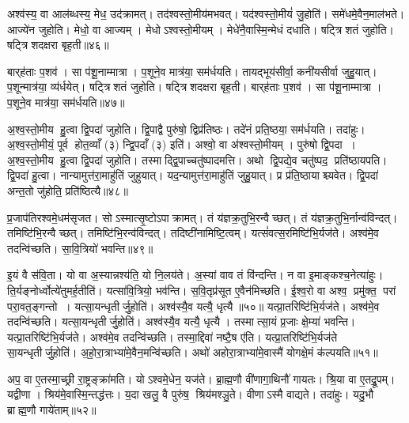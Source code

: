 अश्व॑स्य॒ वा आल॑ब्धस्य॒ मेध॒ उद॑क्रामत्।
तद॑श्वस्तो॒मीय॑मभवत्।
यद॑श्वस्तो॒मीयं॑ जु॒होति॑।
समे॑धमे॒वैन॒माल॑भते।
आज्ये॑न जुहोति।
मेधो॒ वा आज्यम्।
मेधोऽश्वस्तो॒मीयम्।
मेधे॑नै॒वास्मि॒न्मेधं दधाति।
षट्त्रिशतं जुहोति।
षट्त्रिशदक्षरा बृह॒ती॥४६॥

बार्‌ह॑ताः प॒शव॑।
सा प॑शू॒नाम्मात्रा।
प॒शूने॒व मात्र॑या॒ सम॑र्धयति।
तायद्भूय॑सीर्वा॒ कनी॑यसीर्वा जुहु॒यात्।
प॒शून्मात्र॑या॒ व्य॑र्धयेत्।
षट्त्रिशतं जुहोति।
षट्त्रिशदक्षरा बृह॒ती।
बार्‌ह॑ताः प॒शव॑।
सा प॑शू॒नाम्मात्रा।
प॒शूने॒व मात्र॑या॒ सम॑र्धयति॥४७॥

अ॒श्व॒स्तो॒मीय हु॒त्वा द्वि॒पदा॑ जुहोति।
द्वि॒पाद्वै पुरु॑षो॒ द्विप्र॑तिष्ठः।
तदे॑नं प्रति॒ष्ठया॒ सम॑र्धयति।
तदा॑हुः।
अ॒श्व॒स्तो॒मीयं॒ पूर्व होत॒व्याँ (३) न्द्वि॒पदाँ (३) इति॑।
अश्वो॒ वा अ॑श्वस्तो॒मीयम्।
पुरु॑षो द्वि॒पदा।
अ॒श्व॒स्तो॒मीय हु॒त्वा द्वि॒पदा॑ जुहोति।
तस्माद्द्वि॒पाच्चतु॑ष्पादमत्ति।
अथो द्वि॒पद्ये॒व चतु॑ष्पद॒ प्रति॑ष्ठायपति।
द्वि॒पदा॑ हु॒त्वा।
नान्यामुत्त॑रा॒माहु॑तिं जुहुयात्।
यद॒न्यामुत्त॑रा॒माहु॑तिं जुहु॒यात्।
प्र प्र॑ति॒ष्ठायाश्च्यवेत।
द्वि॒पदा॑ अन्त॒तो जु॑होति॒ प्रति॑ष्ठित्यै॥४८॥

प्र॒जाप॑तिरश्वमे॒धम॑सृजत।
सोऽस्मात्सृ॒ष्टोऽपाक्रामत्।
तं य॑ज्ञक्र॒तुभि॒रन्वैच्छत्।
तं य॑ज्ञक्र॒तुभि॒र्नान्व॑विन्दत्।
तमिष्टि॑भि॒रन्वैच्छत्।
तमिष्टि॑भि॒रन्व॑विन्दत्।
तदिष्टी॑नामिष्टि॒त्वम्।
यत्सं॑वत्स॒रमिष्टि॑भि॒र्यज॑ते।
अश्व॑मे॒व तदन्वि॑च्छति।
सा॒वि॒त्रियो॑ भवन्ति॥४९॥

इ॒यं वै स॑वि॒ता।
यो वा अ॒स्यान्नश्य॑ति॒ यो नि॒लय॑ते।
अ॒स्यां वाव तं वि॑न्दन्ति।
न वा इ॒माङ्कश्च॒नेत्या॑हुः।
ति॒र्यङ्नोर्ध्वोत्ये॑तुमर्ह॒तीति॑।
यत्सा॑वि॒त्रियो॒ भव॑न्ति।
स॒वि॒तृप्र॑सूत ए॒वैन॑मिच्छति।
ई॒श्व॒रो वा अश्व॒ प्रमु॑क्त॒ परां परा॒वत॒ङ्गन्तो।
यत्सा॒यन्धृतीर्जु॒होति॑।
अश्व॑स्यै॒व यत्यै॒ धृत्यै॥५०॥ यत्प्रा॒तरिष्टि॑भि॒र्यज॑ते।
अश्व॑मे॒व तदन्वि॑च्छति।
यत्सा॒यन्धृतीर्जु॒होति॑।
अश्व॑स्यै॒व यत्यै॒ धृत्यै।
तस्मात्सा॒यं प्र॒जाः क्षे॒म्या॑ भवन्ति।
यत्प्रा॒तरिष्टि॑भि॒र्यज॑ते।
अश्व॑मे॒व तदन्वि॑च्छति।
तस्मा॒द्दिवा॑ नष्टै॒ष ए॑ति।
यत्प्रा॒तरिष्टि॑भि॒र्यज॑ते सा॒यन्धृतीर्जु॒होति॑।
अ॒हो॒रा॒त्राभ्या॑मे॒वैन॒मन्वि॑च्छति।
अथो॑ अहोरा॒त्राभ्या॑मे॒वास्मै॑ योगक्षे॒मं क॑ल्पयति॥५१॥\anuvakamend[भ॒व॒न्ति॒ धृत्या॑ एन॒मन्वि॑च्छ॒त्येकं च]

अप॒ वा ए॒तस्मा॒च्छ्री रा॒ष्ट्रङ्क्रा॑मति।
योऽश्वमे॒धेन॒ यज॑ते।
ब्रा॒ह्म॒णौ वी॑णागा॒थिनौ॑ गायतः।
श्रि॒या वा ए॒तद्रू॒पम्।
यद्वीणा।
श्रिय॑मे॒वास्मि॒न्तद्ध॑त्तः।
य॒दा खलु॒ वै पुरु॑ष॒ श्रिय॑मश्ञु॒ते।
वीणाऽस्मै वाद्यते।
तदा॑हुः।
यदु॒भौ ब्राह्म॒णौ गाये॑ताम्॥५२॥

